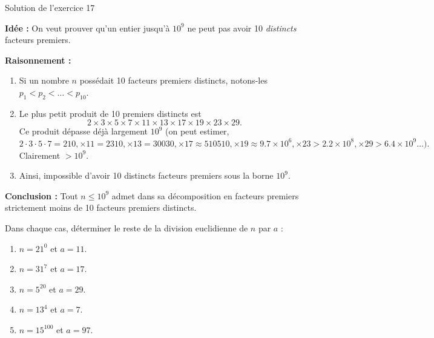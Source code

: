 \documentclass[a4paper,12pt]{article}
\begin{document}
\begin{solutionbox}{Solution de l'exercice 17}

\textbf{Idée :} On veut prouver qu’un entier jusqu’à $10^9$ ne peut pas avoir 10 \emph{distincts} facteurs premiers.

\textbf{Raisonnement :}
\begin{enumerate}
  \item Si un nombre $n$ possédait 10 facteurs premiers distincts, notons-les $p_1<p_2<\dots <p_{10}.$  
  \item Le plus petit produit de 10 premiers distincts est 
    $$
    2\times 3\times 5\times7\times11\times13\times17\times19\times23\times29.
    $$
    Ce produit dépasse déjà largement $10^9$ (on peut estimer, $2\cdot3\cdot5\cdot7=210, \times11=2310,\times13=30030,\times17\approx 510510,\times19\approx9.7\times10^6,\times23>2.2\times10^8,\times29>6.4\times10^9...).$ Clairement $>10^9.$
  \item Ainsi, impossible d’avoir 10 distincts facteurs premiers sous la borne $10^9.$
\end{enumerate}

\textbf{Conclusion :} Tout $n\le 10^9$ admet dans sa décomposition en facteurs premiers strictement moins de 10 facteurs premiers distincts.

\end{solutionbox}

\begin{exercice}[title=Exercice 18 $\star$ { [Calculer] }]{}{}
    Dans chaque cas, déterminer le reste de la division euclidienne de $n$ par $a$ :
    \begin{enumerate}
      \item $n = 21^0$ et $a = 11$.
      \item $n = 31^7$ et $a = 17$.
      \item $n = 5^{20}$ et $a = 29$.
      \item $n = 13^4$ et $a = 7$.
      \item $n = 15^{100}$ et $a = 97$.
    \end{enumerate}
    \end{exercice}
    
\end{document}
